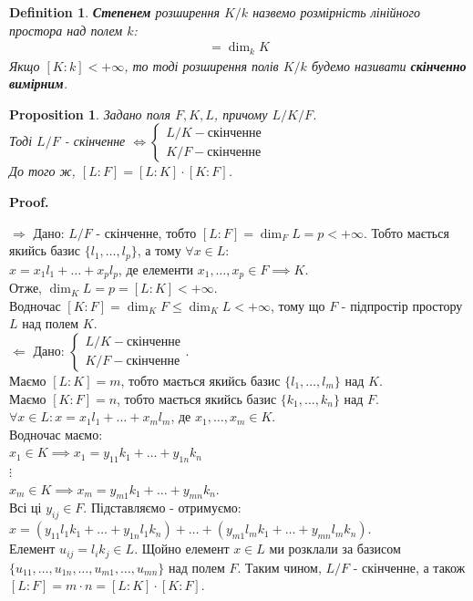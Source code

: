 \documentclass[a4paper, 10pt]{article}
\makeatletter
\theoremstyle{theoremdd}
\theoremstyle{theoremdd}
\newtheorem{definition}[theorem]{Definition}
\theoremstyle{theoremdd}
\theoremstyle{theoremdd}
\theoremstyle{theoremdd}
\newtheorem{proposition}[theorem]{Proposition}
\theoremstyle{theoremdd}
\theoremstyle{theoremdd}
\theoremstyle{theoremdd}
\def\rightproof{$\boxed{\Rightarrow}$ }
\def\leftproof{$\boxed{\Leftarrow}$ }
\renewenvironment{proof}[1][Proof.\\]{\par
\pushQED{\hfill \qed}%
\normalfont \topsep6\p@\@plus6\p@\relax
\trivlist
\item\relax
{\bfseries
#1\@addpunct{.}}\hspace\labelsep\ignorespaces
}{%
\popQED\endtrivlist\@endpefalse
}
\makeatother
\begin{document}
\begin{definition}
\textbf{Степенем} розширення $K/k$ назвемо розмірність лінійного простора над полем $k$:
\begin{align*}
[K:k] = \dim_k K
\end{align*}
Якщо $[K:k] < +\infty$, то тоді розширення полів $K/k$ будемо називати \textbf{скінченно вимірним}.
\end{definition}

\begin{proposition}
Задано поля $F,K,L$, причому $L/K/F$.\\
Тоді $L/F$ - скінченне $\iff \begin{cases} L/K - \text{скінченне} \\ K/F - \text{скінченне} \end{cases}$\\
До того ж, $[L:F] = [L:K] \cdot [K:F]$.
\end{proposition}

\begin{proof}
\rightproof Дано: $L/F$ - скінченне, тобто $[L:F] = \dim_F L = p < +\infty$. Тобто мається якийсь базис $\{l_1,\dots,l_p\}$, а тому $\forall x \in L:$\\
$x = x_1 l_1 + \dots + x_p l_p$, де елементи $x_1,\dots,x_p \in F \implies K$.\\
Отже, $\dim_K L = p = [L : K] < +\infty$.\\
Водночас $[K: F] = \dim_K F \leq \dim_K L < +\infty$, тому що $F$ - підпростір простору $L$ над полем $K$.
\bigskip \\
\leftproof Дано: $\begin{cases} L/K - \text{скінченне} \\ K/F - \text{скінченне} \end{cases}$.\\
Маємо $[L:K] = m$, тобто мається якийсь базис $\{l_1,\dots,l_m\}$ над $K$.\\
Маємо $[K:F] = n$, тобто мається якийсь базис $\{k_1,\dots,k_n\}$ над $F$.\\
$\forall x \in L: x = x_1 l_1 + \dots + x_m l_m$, де $x_1,\dots,x_m \in K$.\\
Водночас маємо:\\
$x_1 \in K \implies x_1 = y_{11}k_1 + \dots + y_{1n}k_n$\\
$\vdots$\\
$x_m \in K \implies x_m = y_{m1}k_1 + \dots + y_{mn}k_n$.\\
Всі ці $y_{ij} \in F$. Підставляємо - отримуємо:\\
$x = (y_{11}l_1k_1 + \dots + y_{1n}l_1k_n) + \dots + (y_{m1}l_mk_1 + \dots + y_{mn}l_m k_n)$.\\
Елемент $u_{ij} = l_i k_j \in L$. Щойно елемент $x \in L$ ми розклали за базисом $\{u_{11},\dots,u_{1n},\dots,u_{m1},\dots,u_{mn}\}$ над полем $F$. Таким чином, $L/F$ - скінченне, а також\\
$[L:F] = m \cdot n = [L:K] \cdot [K:F]$.
\end{proof}
\end{document}
